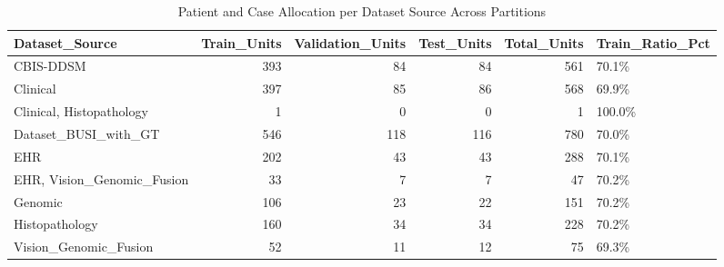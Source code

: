 \begin{table}
\caption{Patient and Case Allocation per Dataset Source Across Partitions}
\label{tab:table_patient_distribution}
\begin{tabular}{lrrrrl}
\toprule
Dataset\_Source & Train\_Units & Validation\_Units & Test\_Units & Total\_Units & Train\_Ratio\_Pct \\
\midrule
CBIS-DDSM & 393 & 84 & 84 & 561 & 70.1\% \\
Clinical & 397 & 85 & 86 & 568 & 69.9\% \\
Clinical, Histopathology & 1 & 0 & 0 & 1 & 100.0\% \\
Dataset\_BUSI\_with\_GT & 546 & 118 & 116 & 780 & 70.0\% \\
EHR & 202 & 43 & 43 & 288 & 70.1\% \\
EHR, Vision\_Genomic\_Fusion & 33 & 7 & 7 & 47 & 70.2\% \\
Genomic & 106 & 23 & 22 & 151 & 70.2\% \\
Histopathology & 160 & 34 & 34 & 228 & 70.2\% \\
Vision\_Genomic\_Fusion & 52 & 11 & 12 & 75 & 69.3\% \\
\bottomrule
\end{tabular}
\end{table}

